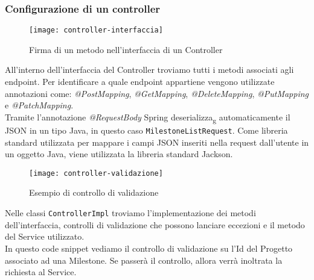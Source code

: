 \subsubsection{Configurazione di un controller}
\begin{figure}[H] 
    \centering 
    \texttt{[image: controller-interfaccia]} 
    \caption{Firma di un metodo nell'interfaccia di un Controller}
\end{figure}
\noindent All'interno dell'interfaccia del Controller troviamo tutti i metodi associati agli endpoint. Per identificare a quale endpoint appartiene vengono utilizzate annotazioni come: \textit{@PostMapping}, \textit{@GetMapping}, \textit{@DeleteMapping}, \textit{@PutMapping} e \textit{@PatchMapping}.\\
Tramite l'annotazione \textit{@RequestBody} Spring deserializza\textsubscript{g} automaticamente il JSON in un tipo Java, in questo caso \texttt{MilestoneListRequest}.
Come libreria standard utilizzata per mappare i campi JSON inseriti nella request dall'utente in un oggetto Java, viene utilizzata la libreria standard Jackson.

\begin{figure}[H] 
    \centering 
    \texttt{[image: controller-validazione]} 
    \caption{Esempio di controllo di validazione}
\end{figure}
\noindent Nelle classi \texttt{ControllerImpl} troviamo l'implementazione dei metodi dell'interfaccia, controlli di validazione che possono lanciare eccezioni e il metodo del Service utilizzato.\\
In questo code snippet vediamo il controllo di validazione su l'Id del Progetto associato ad una Milestone. Se passerà il controllo, allora verrà inoltrata la richiesta al Service.



